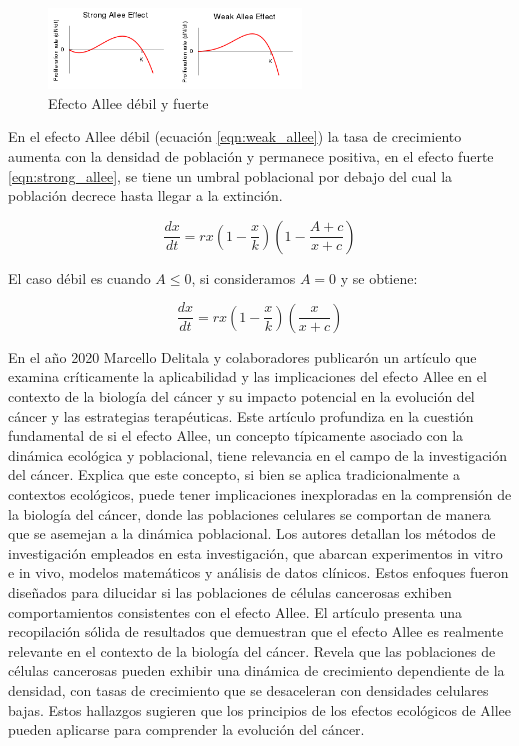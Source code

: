 \documentclass{article}
\begin{document}
\begin{figure}[ht]
    \centering
    \includegraphics[width=0.6\textwidth]{images/Allee.png}
    \caption{Efecto Allee débil y fuerte}
    \label{fig:allees}
\end{figure}

En el efecto Allee débil (ecuación \ref{eqn:weak_allee}) la tasa de crecimiento aumenta con la densidad de población y permanece positiva, en el efecto fuerte \ref{eqn:strong_allee}, se tiene un umbral poblacional por debajo del cual la población decrece hasta llegar a la extinción.

\begin{equation}
    \frac{d x}{ dt} = r x (1 - \frac{x}{k})(1- \frac{A+ c}{x + c})
    \label{eqn:strong_allee}
\end{equation}

El caso débil es cuando $A\leq 0$, si consideramos $A=0$ y se obtiene:

\begin{equation}
    \frac{d x}{ dt} = r x (1 - \frac{x}{k})(\frac{x}{x + c})
    \label{eqn:weak_allee}
\end{equation}

En el año 2020 Marcello Delitala y colaboradores publicarón un artículo que examina críticamente la aplicabilidad y las implicaciones del efecto Allee en el contexto de la biología del cáncer y su impacto potencial en la evolución del cáncer y las estrategias terapéuticas. Este artículo profundiza en la cuestión fundamental de si el efecto Allee, un concepto típicamente asociado con la dinámica ecológica y poblacional, tiene relevancia en el campo de la investigación del cáncer. Explica que este concepto, si bien se aplica tradicionalmente a contextos ecológicos, puede tener implicaciones inexploradas en la comprensión de la biología del cáncer, donde las poblaciones celulares se comportan de manera que se asemejan a la dinámica poblacional. Los autores detallan los métodos de investigación empleados en esta investigación, que abarcan experimentos in vitro e in vivo, modelos matemáticos y análisis de datos clínicos. Estos enfoques fueron diseñados para dilucidar si las poblaciones de células cancerosas exhiben comportamientos consistentes con el efecto Allee. El artículo presenta una recopilación sólida de resultados que demuestran que el efecto Allee es realmente relevante en el contexto de la biología del cáncer. Revela que las poblaciones de células cancerosas pueden exhibir una dinámica de crecimiento dependiente de la densidad, con tasas de crecimiento que se desaceleran con densidades celulares bajas. Estos hallazgos sugieren que los principios de los efectos ecológicos de Allee pueden aplicarse para comprender la evolución del cáncer.
\end{document}

